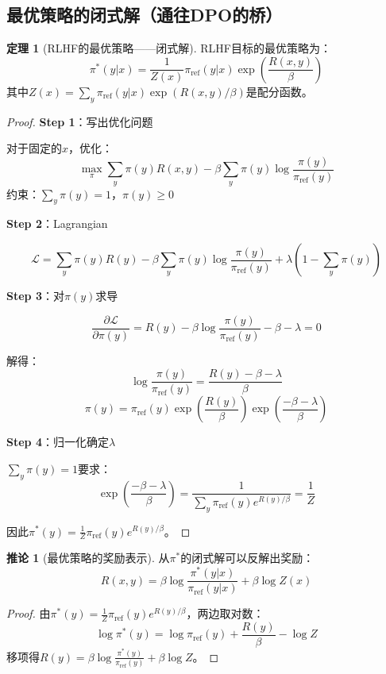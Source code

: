 \documentclass[11pt,a4paper]{article}
\theoremstyle{definition}
\newtheorem{theorem}{定理}[section]
\newtheorem{corollary}{推论}[section]
\begin{document}
\subsection{最优策略的闭式解（通往DPO的桥）}

\begin{theorem}[RLHF的最优策略——闭式解]
RLHF目标的最优策略为：
\[
\pi^*(y|x) = \frac{1}{Z(x)} \pi_{\text{ref}}(y|x) \exp\left(\frac{R(x,y)}{\beta}\right)
\]
其中$Z(x) = \sum_y \pi_{\text{ref}}(y|x) \exp(R(x,y)/\beta)$是配分函数。
\end{theorem}

\begin{proof}
\textbf{Step 1}：写出优化问题

对于固定的$x$，优化：
\[
\max_{\pi} \sum_y \pi(y) R(x,y) - \beta \sum_y \pi(y) \log \frac{\pi(y)}{\pi_{\text{ref}}(y)}
\]
约束：$\sum_y \pi(y) = 1$，$\pi(y) \geq 0$

\textbf{Step 2}：Lagrangian

\[
\mathcal{L} = \sum_y \pi(y) R(y) - \beta \sum_y \pi(y) \log \frac{\pi(y)}{\pi_{\text{ref}}(y)} + \lambda\left(1 - \sum_y \pi(y)\right)
\]

\textbf{Step 3}：对$\pi(y)$求导

\[
\frac{\partial \mathcal{L}}{\partial \pi(y)} = R(y) - \beta \log \frac{\pi(y)}{\pi_{\text{ref}}(y)} - \beta - \lambda = 0
\]

解得：
\[
\log \frac{\pi(y)}{\pi_{\text{ref}}(y)} = \frac{R(y) - \beta - \lambda}{\beta}
\]
\[
\pi(y) = \pi_{\text{ref}}(y) \exp\left(\frac{R(y)}{\beta}\right) \exp\left(\frac{-\beta - \lambda}{\beta}\right)
\]

\textbf{Step 4}：归一化确定$\lambda$

$\sum_y \pi(y) = 1$要求：
\[
\exp\left(\frac{-\beta - \lambda}{\beta}\right) = \frac{1}{\sum_y \pi_{\text{ref}}(y) e^{R(y)/\beta}} = \frac{1}{Z}
\]

因此$\pi^*(y) = \frac{1}{Z} \pi_{\text{ref}}(y) e^{R(y)/\beta}$。
\end{proof}

\begin{corollary}[最优策略的奖励表示]
从$\pi^*$的闭式解可以反解出奖励：
\[
R(x, y) = \beta \log \frac{\pi^*(y|x)}{\pi_{\text{ref}}(y|x)} + \beta \log Z(x)
\]
\end{corollary}

\begin{proof}
由$\pi^*(y) = \frac{1}{Z} \pi_{\text{ref}}(y) e^{R(y)/\beta}$，两边取对数：
\[
\log \pi^*(y) = \log \pi_{\text{ref}}(y) + \frac{R(y)}{\beta} - \log Z
\]
移项得$R(y) = \beta \log \frac{\pi^*(y)}{\pi_{\text{ref}}(y)} + \beta \log Z$。
\end{proof}
\end{document}
